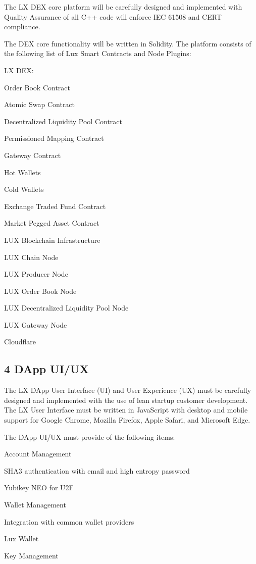 \documentclass[11pt]{article}
\begin{document}
The LX DEX core platform will be carefully designed and implemented with Quality Assurance of all C++ code will enforce IEC 61508 and CERT compliance.


The DEX core functionality will be written in Solidity. The platform consists of the following list of Lux  Smart Contracts and Node Plugins:


LX DEX:


Order Book Contract


Atomic Swap Contract


Decentralized Liquidity Pool Contract


Permissioned Mapping Contract


Gateway Contract


Hot Wallets


Cold Wallets


Exchange Traded Fund Contract


Market Pegged Asset Contract


LUX Blockchain Infrastructure


LUX Chain Node


LUX Producer Node


LUX Order Book Node


LUX Decentralized Liquidity Pool Node


LUX Gateway Node


Cloudflare


\subsection{4 DApp UI/UX}

The LX DApp User Interface (UI) and User Experience (UX) must be carefully designed and implemented with the use of lean startup customer development. The LX User Interface must be written in JavaScript with desktop and mobile support for Google Chrome, Mozilla Firefox, Apple Safari, and Microsoft Edge.


The DApp UI/UX must provide of the following items:


Account Management


SHA3 authentication with email and high entropy password


Yubikey NEO for U2F


Wallet Management


Integration with common wallet providers


Lux Wallet


Key Management
\end{document}
